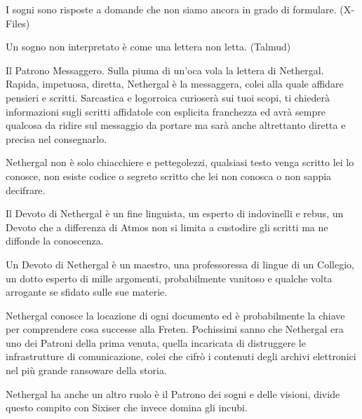 \begin{multicols}{2}
\begin{enfasi}{
I sogni sono risposte a domande che non siamo ancora in grado di formulare. (X-Files)

\medskip

Un sogno non interpretato è come una lettera non letta. (Talmud)
}\end{enfasi}

\medskip

Il Patrono Messaggero. Sulla piuma di un'oca vola la lettera di Nethergal. Rapida, impetuosa, diretta, Nethergal è la messaggera, colei alla quale affidare pensieri e scritti. Sarcastica e logorroica curioserà sui tuoi scopi, ti chiederà informazioni sugli scritti affidatole con esplicita franchezza ed avrà sempre qualcosa da ridire sul messaggio da portare ma sarà anche altrettanto diretta e precisa nel consegnarlo.

Nethergal non è solo chiacchiere e pettegolezzi, qualsiasi testo venga scritto lei lo conosce, non esiste codice o segreto scritto che lei non conosca o non sappia decifrare.

Il Devoto di Nethergal è un fine linguista, un esperto di indovinelli e rebus, un Devoto che a differenza di Atmos non si limita a custodire gli scritti ma ne diffonde la conoscenza.

Un Devoto di Nethergal è un maestro, una professoressa di lingue di un Collegio, un dotto esperto di mille argomenti, probabilmente vanitoso e qualche volta arrogante se sfidato sulle sue materie.

Nethergal conosce la locazione di ogni documento ed è probabilmente la chiave per comprendere cosa successe alla Freten. Pochissimi sanno che Nethergal era uno dei Patroni della prima venuta, quella incaricata di distruggere le infrastrutture di comunicazione, colei che cifrò i contenuti degli archivi elettronici nel più grande ransoware della storia.

Nethergal ha anche un altro ruolo è il Patrono dei sogni e delle visioni, divide questo compito con Sixiser che invece domina gli incubi.


\end{multicols}
